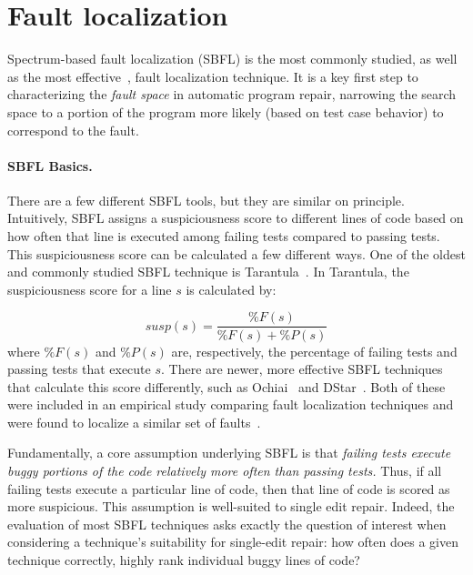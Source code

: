 \section{Fault localization} \label{secFL}



Spectrum-based fault localization (SBFL) is the most commonly studied, as well as the most 
effective~\cite{zou2019empirical}, fault localization technique. It is a key
first step to characterizing the \emph{fault space} in automatic program repair,
narrowing the search space to a portion of the program more likely (based on
test case behavior) to correspond to the fault.  

\paragraph{SBFL Basics.} 
There are a few different SBFL tools, but they are 
similar on principle. Intuitively, SBFL assigns a suspiciousness score to different lines of 
code based on how often that line is executed among failing tests compared to passing 
tests. This suspiciousness score can be calculated a few different ways. One of the oldest 
and commonly studied SBFL technique is Tarantula~\cite{tarantula}. In Tarantula, the 
suspiciousness score for a line $s$ is calculated by:

$$\mathit{susp(s)} 
=\frac{\mathit{\%F(s)}}{\mathit{\%F(s)} + \mathit{\%P(s)}}$$
where  $\mathit{\%F(s)}$ and $\mathit{\%P(s)}$ are, respectively, the percentage of failing 
tests and passing tests that execute $s$. There are newer, more effective 
SBFL techniques that calculate this score differently, such as Ochiai~\cite{ochiai} and 
DStar~\cite{wong2013dstar}. Both of these were included in an empirical study 
comparing fault localization techniques and were found to localize a similar set of 
faults~\cite{zou2019empirical}.
  

Fundamentally, a core assumption underlying SBFL is that \emph{failing tests execute 
buggy portions of the code relatively more often than passing tests.} 
Thus, if all failing tests execute a 
particular line of code, then that line of code is scored as more suspicious.
This assumption is well-suited to single edit repair. Indeed, the evaluation
of most SBFL techniques asks exactly the question of interest when considering a
technique's suitability for single-edit repair: how often does a given technique
correctly, highly rank individual buggy lines of code? 

